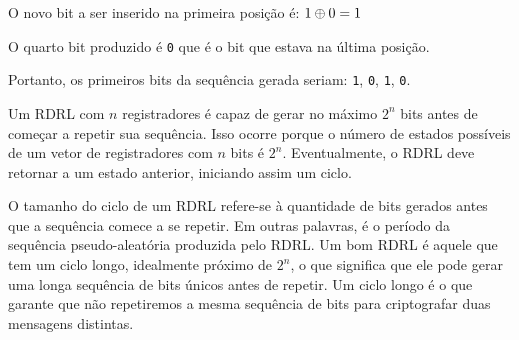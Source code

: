 \begin{example}
\begin{center}
\end{center}

O novo bit a ser inserido na primeira posição é: $1 \oplus 0 = 1$

O quarto bit produzido é {\tt 0} que é o bit que estava na última posição.

Portanto, os primeiros bits da sequência gerada seriam: {\tt 1}, {\tt 0}, {\tt 1}, {\tt 0}.

\end{example}

Um RDRL com $n$ registradores é capaz de gerar no máximo $2^n$ bits antes de começar a repetir sua sequência.
Isso ocorre porque o número de estados possíveis de um vetor de registradores com $n$ bits é $2^n$.
Eventualmente, o RDRL deve retornar a um estado anterior, iniciando assim um ciclo.

O tamanho do ciclo de um RDRL refere-se à quantidade de bits gerados antes que a sequência comece a se repetir.
Em outras palavras, é o período da sequência pseudo-aleatória produzida pelo RDRL.
Um bom RDRL é aquele que tem um ciclo longo, idealmente próximo de $2^n$, o que significa que ele pode gerar uma longa sequência de bits únicos antes de repetir.
Um ciclo longo é o que garante que não repetiremos a mesma sequência de bits para criptografar duas mensagens distintas.




